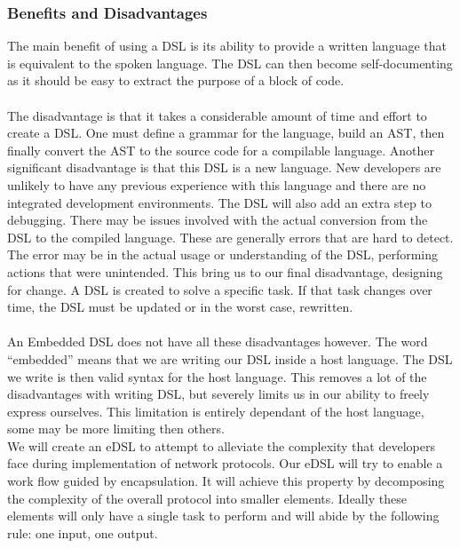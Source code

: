 \subsubsection{Benefits and Disadvantages}
The main benefit of using a DSL is its ability to provide a written language that is equivalent to the spoken language. The DSL can then become self-documenting as it should be easy to extract the purpose of a block of code.
\\\\
The disadvantage is that it takes a considerable amount of time and effort to create a DSL. One must define a grammar for the language, build an AST, then finally convert the AST to the source code for a compilable language. Another significant disadvantage is that this DSL is a new language. New developers are unlikely to have any previous experience with this language and there are no integrated development environments. The DSL will also add an extra step to debugging. There may be issues involved with the actual conversion from the DSL to the compiled language. These are generally errors that are hard to detect. The error may be in the actual usage or understanding of the DSL, performing actions that were unintended. This bring us to our final disadvantage, designing for change. A DSL is created to solve a specific task. If that task changes over time, the DSL must be updated or in the worst case, rewritten. 
\\\\
An Embedded DSL does not have all these disadvantages however. The word ``embedded'' means that we are writing our DSL inside a host language. The DSL we write is then valid syntax for the host language. This removes a lot of the disadvantages with writing DSL, but severely limits us in our ability to freely express ourselves. This limitation is entirely dependant of the host language, some may be more limiting then others.
\\
We will create an eDSL to attempt to alleviate the complexity that developers face during implementation of network protocols. Our eDSL will try to enable a work flow guided by encapsulation. It will achieve this property by decomposing the complexity of the overall protocol into smaller elements. Ideally these elements will only have a single task to perform and will abide by the following rule: one input, one output. 



